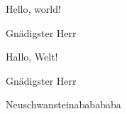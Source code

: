 \documentclass{minimal}
\def\gnaeherr{%
\begin{minipage}{2sp}
\hskip 1sp Gnädigster Herr
\end{minipage}%
}
\begin{document}
Hello, world!

\gnaeherr

\begin{german}
Hallo, Welt!

\gnaeherr

\begin{minipage}{2sp}
\hskip 1sp Neuschwansteinababababa

\showthe\language
\end{minipage}
\end{german}
\end{document}
